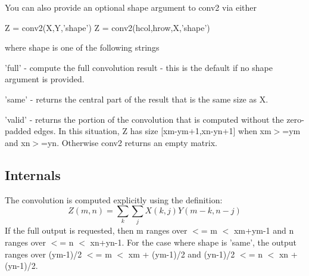 You can also provide an optional {\ttfamily shape} argument to {\ttfamily conv2} via either \begin{DoxyVerb}    Z = conv2(X,Y,'shape')
    Z = conv2(hcol,hrow,X,'shape')
\end{DoxyVerb}
 where {\ttfamily shape} is one of the following strings 
\begin{DoxyItemize}
\item {\ttfamily 'full'} -\/ compute the full convolution result -\/ this is the default if no {\ttfamily shape} argument is provided.  
\item {\ttfamily 'same'} -\/ returns the central part of the result that is the same size as {\ttfamily X}.  
\item {\ttfamily 'valid'} -\/ returns the portion of the convolution that is computed without the zero-\/padded edges. In this situation, {\ttfamily Z} has size {\ttfamily \mbox{[}xm-\/ym+1,xn-\/yn+1\mbox{]}} when {\ttfamily xm$>$=ym} and {\ttfamily xn$>$=yn}. Otherwise {\ttfamily conv2} returns an empty matrix.  
\end{DoxyItemize}\hypertarget{transforms_svd_Function}{}\subsection{Internals}\label{transforms_svd_Function}
The convolution is computed explicitly using the definition\-: \[ Z(m,n) = \sum_{k} \sum_{j} X(k,j) Y(m-k,n-j) \] If the full output is requested, then {\ttfamily m} ranges over { $<$= m $<$ xm+ym-\/1} and {\ttfamily n} ranges over { $<$= n $<$ xn+yn-\/1}. For the case where {\ttfamily shape} is {\ttfamily 'same'}, the output ranges over {\ttfamily (ym-\/1)/2 $<$= m $<$ xm + (ym-\/1)/2} and {\ttfamily (yn-\/1)/2 $<$= n $<$ xn + (yn-\/1)/2}. 